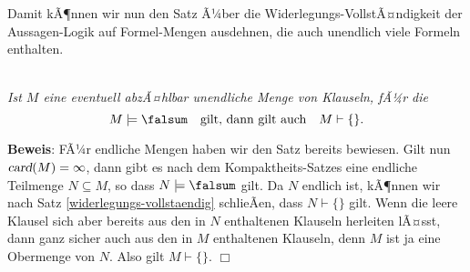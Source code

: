 Damit kÃ¶nnen wir nun den Satz Ã¼ber die Widerlegungs-VollstÃ¤ndigkeit der Aussagen-Logik auf
Formel-Mengen ausdehnen, die auch unendlich viele Formeln enthalten.

\begin{Satz}
  \label{widerlegungs-vollstaendig2}
 \hspace*{\fill} \\ 
{\em
  Ist $M$ eine eventuell abzÃ¤hlbar unendliche Menge von Klauseln, fÃ¼r die
  \[ M \models \falsum \quad \mbox{gilt, dann gilt auch} \quad M \vdash \{\}. \]
}
\end{Satz}

\noindent
\textbf{Beweis}:  FÃ¼r endliche Mengen haben wir den Satz bereits bewiesen.
Gilt nun $\textsl{card}(M) = \infty$, dann gibt es nach dem Kompaktheits-Satzes eine
endliche Teilmenge $N \subseteq M$, so dass $N \models \falsum$
gilt.  Da $N$ endlich ist, kÃ¶nnen wir nach Satz \ref{widerlegungs-vollstaendig} schlieÃen,
dass $N \vdash \{\}$
gilt.  Wenn die leere Klausel sich aber bereits aus den in $N$ enthaltenen Klauseln
herleiten lÃ¤sst, dann  ganz sicher auch aus den in $M$ enthaltenen Klauseln, denn $M$ ist
ja eine Obermenge von $N$.  Also gilt $M \vdash \{\}$.
\hspace*{\fill} $\Box$
\vspace*{0.3cm}

